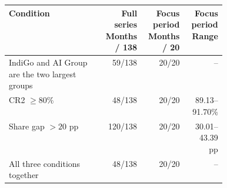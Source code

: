 \begin{tabular}{@{}>{\raggedright\arraybackslash}p{0.43\linewidth}rrr@{}}
\toprule
Condition & \shortstack{Full series\\Months / 138} & \shortstack{Focus period\\Months / 20} & \shortstack{Focus period\\Range} \\
\midrule
IndiGo and AI Group are the two largest groups & 59/138 & 20/20 & -- \\
CR2 $\geq 80\%$ & 48/138 & 20/20 & 89.13--91.70\% \\
Share gap $>20$ pp & 120/138 & 20/20 & 30.01--43.39 pp \\
All three conditions together & 48/138 & 20/20 & -- \\
\bottomrule
\end{tabular}
